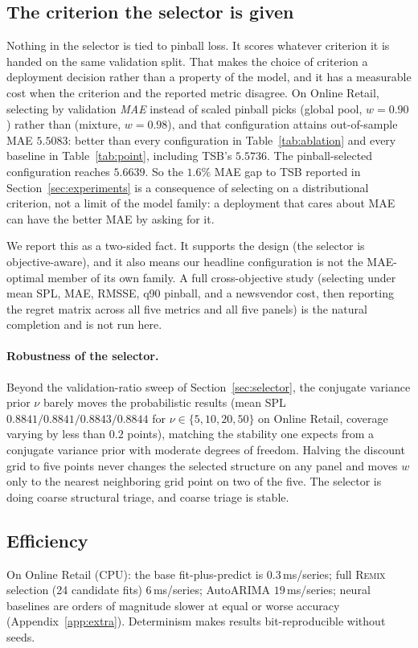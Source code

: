 \documentclass[twocolumn,10pt]{article}
\newcommand{\REMIX}{\textsc{Remix}}
\begin{document}
\subsection{The criterion the selector is given}\label{sec:criterion}
Nothing in the selector is tied to pinball loss. It scores whatever
criterion it is handed on the same validation split. That makes the
choice of criterion a deployment decision rather than a property of the
model, and it has a measurable cost when the criterion and the reported
metric disagree. On Online Retail, selecting by validation \emph{MAE}
instead of scaled pinball picks (global pool, $w{=}0.90$) rather than
(mixture, $w{=}0.98$), and that configuration attains out-of-sample MAE
$5.5083$: better than every configuration in
Table~\ref{tab:ablation} and every baseline in Table~\ref{tab:point},
including TSB's $5.5736$. The pinball-selected configuration reaches
$5.6639$. So the $1.6\%$ MAE gap to TSB reported in
Section~\ref{sec:experiments} is a consequence of selecting on a
distributional criterion, not a limit of the model family: a deployment
that cares about MAE can have the better MAE by asking for it.

We report this as a two-sided fact. It supports the design (the selector
is objective-aware), and it also means our headline configuration is not
the MAE-optimal member of its own family. A full cross-objective study
(selecting under mean SPL, MAE, RMSSE, q90 pinball, and a newsvendor cost,
then reporting the regret matrix across all five metrics and all five
panels) is the natural completion and is not run here.

\paragraph{Robustness of the selector.} Beyond the validation-ratio
sweep of Section~\ref{sec:selector}, the conjugate variance prior
$\nu$ barely moves the probabilistic results
(mean SPL $0.8841/0.8841/0.8843/0.8844$ for $\nu\in\{5,10,20,50\}$ on
Online Retail, coverage varying by less than $0.2$ points), matching the
stability one expects from a conjugate variance prior with moderate
degrees of freedom. Halving the discount grid to five points never changes the
selected structure on any panel and moves $w$ only to the nearest
neighboring grid point on two of the five. The selector is doing coarse
structural triage, and coarse triage is stable.

\subsection{Efficiency}\label{sec:efficiency}
On Online Retail (CPU): the base fit-plus-predict is $0.3$\,ms/series;
full \REMIX{} selection (24 candidate fits) $6$\,ms/series; AutoARIMA
$19$\,ms/series; neural baselines are orders of magnitude slower at equal
or worse accuracy (Appendix~\ref{app:extra}). Determinism makes results
bit-reproducible without seeds.
\end{document}
